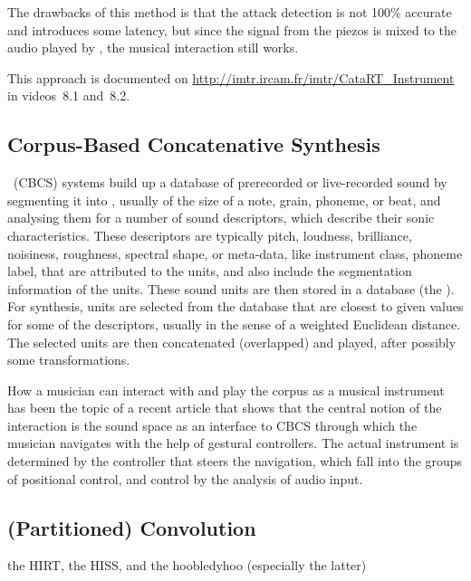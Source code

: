 The drawbacks of this method is that the attack detection is not 100\% accurate and introduces some latency, but since the signal from the piezos is mixed to the
audio played by \catart, the musical interaction still works.


This approach is documented on \url{http://imtr.ircam.fr/imtr/CataRT_Instrument} in videos~8.1 and~8.2.


\subsection{Corpus-Based Concatenative Synthesis}


\Cbcs\ (CBCS) \cite{Schwarz-ieeespm2007-concat} systems build up a database of prerecorded or live-recorded sound by segmenting it into
, usually of the size of a note, grain, phoneme, or beat, and analysing them for a
number of sound descriptors, which describe their sonic characteristics.
These descriptors are typically pitch, loudness, brilliance, noisiness, roughness, spectral shape, or meta-data, like instrument class, phoneme label, that are attributed to the units,
and also include the segmentation information of the units.
These sound units are then stored in a database (the ).  For synthesis, units are
selected from the database that are closest to given  values for some of the
descriptors, usually in the sense of a weighted Euclidean distance.
The selected units are then concatenated (overlapped) and played, after possibly some transformations.


How a musician can interact with and play the corpus as a musical instrument has been the topic of a recent article \cite{Schwarz-nime2012-sound-space} that shows that the central notion of the interaction is the sound space as an interface to CBCS through which the musician navigates with the help of gestural controllers.  
The actual instrument is determined by the controller that steers the
navigation, which fall into the groups of positional control, and control by the analysis of audio
input.


\subsection{(Partitioned) Convolution}


the HIRT, the HISS, and the hoobledyhoo (especially the latter)
